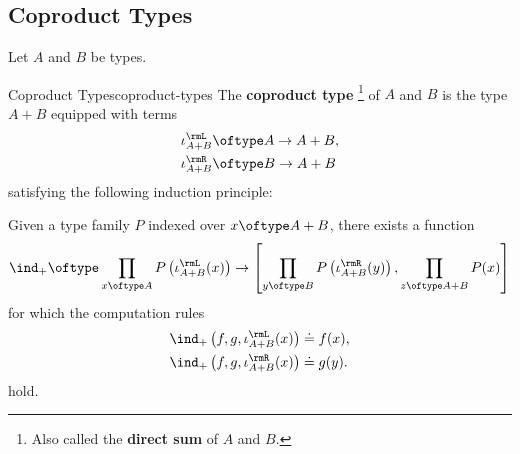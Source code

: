 \subsection{Coproduct Types}\label{subsection-coproduct-types}
Let $A$ and $B$ be types.
\begin{definition}{Coproduct Types}{coproduct-types}%
    The \textbf{coproduct type}%
    \footnote{%
        Also called the \textbf{direct sum} of $A$ and $B$.
        \par\vspace*{\TCBBoxCorrection}
    } %
    of $A$ and $B$ is the type $A+B$ equipped with terms
    \begin{align*}
        \iota^{\rmL}_{A+B} &\oftype A\to A+B,\\%
        \iota^{\rmR}_{A+B} &\oftype B\to A+B%
    \end{align*}
    satisfying the following induction principle:
    \begin{itemize}
        \itemstar Given a type family $P$ indexed over $x\oftype A+B$, there exists a function
            \[
                \ind_{+}%
                \oftype%
                \prod_{x\oftype A}P\left(\iota^{\rmL}_{A+B}(x)\right)%
                \to
                \left[\prod_{y\oftype B}P\left(\iota^{\rmR}_{A+B}(y)\right),\prod_{z\oftype A+B}P(x)\right]
            \]%
            for which the computation rules
            \begin{align*}
                \ind_{+}\left(f,g,\iota^{\rmL}_{A+B}(x)\right) &\doteq f(x),\\
                \ind_{+}\left(f,g,\iota^{\rmR}_{A+B}(x)\right) &\doteq g(y).
            \end{align*}
            hold.
    \end{itemize}
\end{definition}
